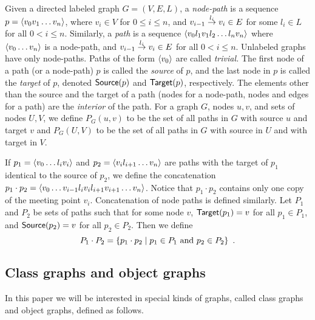 Given a directed labeled graph $G=(V,E,L)$, a {\em node-path} is a
sequence $p=\left\langle v_0v_1\ldots v_n \right\rangle$, where $v_i\in V$ for $0\le i\le
n$, and $v_{i-1}\stackrel{l_i}{\rightarrow}v_i\in E$ for some $l_i\in L$ for all
$0<i\le n$.  Similarly, a {\em path\/} is a sequence
$\left\langle v_0l_1v_1l_2\ldots l_nv_n \right\rangle$ where $\left\langle v_0\ldots v_n \right\rangle$ is a
node-path, and $v_{i-1}\stackrel{l_{i}}{\rightarrow}v_{i}\in E$ for all $0< i\le
n$.  Unlabeled graphs have only node-paths.  Paths of the form
$\left\langle v_0 \right\rangle$ are called {\em trivial.}  The first node of a path (or a
node-path) $p$ is called the {\em source} of $p$, and the last node in
$p$ is called the {\em target} of $p$, denoted $\mbox{\sf Source}(p)$ and
$\mbox{\sf Target}(p)$, respectively.  The elements other than the source and
the target of a path (nodes for a node-path, nodes and edges for a
path) are the {\em interior} of the path.  For a graph $G$, nodes
$u,v$, and sets of nodes $U,V$, we define $P_G(u,v)$ to be the set of
all paths in $G$ with source $u$ and target $v$ and $P_G(U,V)$ to be
the set of all paths in $G$ with source in $U$ and with target in $V$.

If $p_1 = \left\langle v_0 \ldots l_i v_i \right\rangle$ and $p_2 = \left\langle v_{i}
l_{i+1}\ldots v_n \right\rangle$ are paths with the target of $p_1$ identical to
the source of $p_2$, we define the concatenation $p_1 \cdot p_2 =
\left\langle v_0 \ldots v_{i-1}l_i v_{i}l_{i+1}v_{i+1} \ldots v_n \right\rangle$.  Notice
that $p_1 \cdot p_2$ contains only one copy of the meeting point
$v_i$. Concatenation of node paths is defined similarly.  Let $P_1$
and $P_2$ be sets of paths such that for some node $v$,
$\mbox{\sf Target}(p_1)=v$ for all $p_1\in P_1$, and $\mbox{\sf Source}(p_2)=v$ for all
$p_2\in P_2$.  Then we define
$$
P_1 \cdot P_2 = \left\{  p_1 \cdot p_2\mid p_1 \in P_1\mbox{ and }p_2 \in P_2 \right\}~.
$$

\subsection{Class graphs and object graphs}
In this paper we will be interested in special kinds of graphs, called
class graphs and object graphs, defined as follows.

